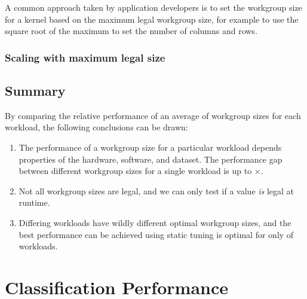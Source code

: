 A common approach taken by application developers is to set the
workgroup size for a kernel based on the maximum legal workgroup size,
for example to use the square root of the maximum to set the number of
columns and rows.


\subsubsection{Scaling with maximum legal size}



\subsection{Summary}

By comparing the relative performance of an average of
 workgroup sizes for each workload, the
following conclusions can be drawn:

\begin{enumerate}
\item The performance of a workgroup size for a particular workload
  depends properties of the hardware, software, and dataset. The
  performance gap between different workgroup sizes for a single
  workload is up to $\times$.
\item Not all workgroup sizes are legal, and we can only test if a
  value \emph{is} legal at runtime.
\item Differing workloads have wildly different optimal workgroup
  sizes, and the best performance can be achieved using static tuning
  is optimal for only  of
  workloads.
\end{enumerate}



\section{Classification Performance}


